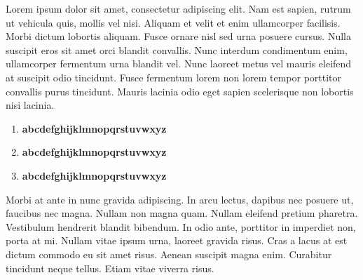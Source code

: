\documentclass{scrartcl}
\begin{document}
Lorem ipsum dolor sit amet, consectetur adipiscing elit. Nam est sapien, rutrum ut vehicula quis, mollis vel nisi. Aliquam et velit et enim ullamcorper facilisis. Morbi dictum lobortis aliquam. Fusce ornare nisl sed urna posuere cursus. Nulla suscipit eros sit amet orci blandit convallis. Nunc interdum condimentum enim, ullamcorper fermentum urna blandit vel. Nunc laoreet metus vel mauris eleifend at suscipit odio tincidunt. Fusce fermentum lorem non lorem tempor porttitor convallis purus tincidunt. Mauris lacinia odio eget sapien scelerisque non lobortis nisi lacinia.

\begin{enumerate}
    \item {\bf abcdefghijklmnopqrstuvwxyz}
    \item {\bfseries{abcdefghijklmnopqrstuvwxyz}}
    \item {\textbf{abcdefghijklmnopqrstuvwxyz}}
\end{enumerate}

Morbi at ante in nunc gravida adipiscing. In arcu lectus, dapibus nec posuere ut, faucibus nec magna. Nullam non magna quam. Nullam eleifend pretium pharetra. Vestibulum hendrerit blandit bibendum. In odio ante, porttitor in imperdiet non, porta at mi. Nullam vitae ipsum urna, laoreet gravida risus. Cras a lacus at est dictum commodo eu sit amet risus. Aenean suscipit magna enim. Curabitur tincidunt neque tellus. Etiam vitae viverra risus.
\end{document}
